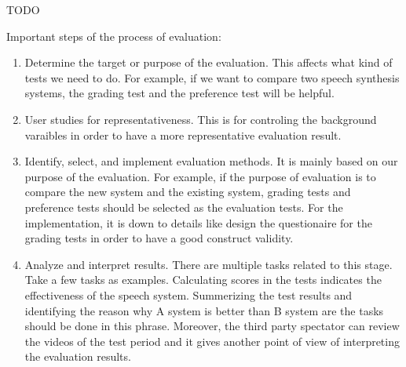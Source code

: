 \documentclass[12pt]{article}
\newenvironment{problem}[2][Problem]{\begin{trivlist}
\item[\hskip \labelsep {\bfseries #1}\hskip \labelsep {\bfseries #2.}]}{\end{trivlist}}
\begin{document}
\begin{problem}{4.2}
    TODO
\end{problem}
\begin{problem}{5.1}
    Important steps of the process of evaluation:
    \begin{enumerate}
        \item Determine the target or purpose of the evaluation. This affects what kind
        of tests we need to do. For example, if we want to compare two 
        speech synthesis systems, the grading test and the preference test will 
        be helpful.

        \item User studies for representativeness. This is for controling the
        background varaibles in order to have a more representative evaluation
        result.        
        
        \item Identify, select, and implement evaluation methods. 
        It is mainly based on our purpose of the evaluation. For example, if the 
        purpose of evaluation is to compare the new system and the existing system,
        grading tests and preference tests should be selected as the evaluation
        tests. For the implementation, it is down to details like design the questionaire
        for the grading tests in order to have a good construct validity.
                
        \item  Analyze and interpret results.
        There are multiple tasks related to this stage. Take a few tasks as examples.
        Calculating scores in the tests indicates the effectiveness of the speech system.
        Summerizing the test results and identifying the reason why A system is 
        better than B system are the tasks should be done in this phrase. Moreover,
        the third party spectator can review the videos of the test period and it
        gives another point of view of interpreting the evaluation results.

    \end{enumerate}
\end{problem}
\end{document}
